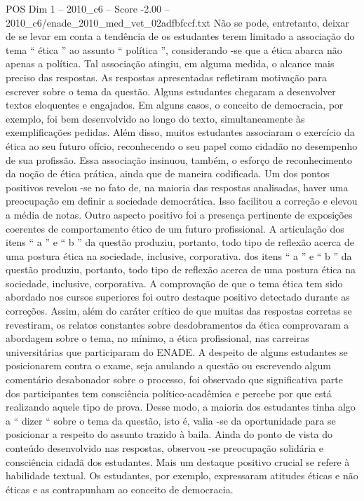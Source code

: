 \begin{textsample}{POS Dim 1 – 2010\_c6 – Score -2.00 – 2010\_c6/enade\_2010\_med\_vet\_02adfbfccf.txt}
Não se pode, entretanto, deixar de se levar em conta a tendência de os estudantes terem limitado a associação do tema “ ética ” ao assunto “ política ”, considerando -se que a ética abarca não apenas a política.
Tal associação atingiu, em alguma medida, o alcance mais preciso das respostas.
As respostas apresentadas refletiram motivação para escrever sobre o tema da questão.
Alguns estudantes chegaram a desenvolver textos eloquentes e engajados.
Em alguns casos, o conceito de democracia, por exemplo, foi bem desenvolvido ao longo do texto, simultaneamente às exemplificações pedidas.
Além disso, muitos estudantes associaram o exercício da ética ao seu futuro ofício, reconhecendo o seu papel como cidadão no desempenho de sua profissão.
Essa associação insinuou, também, o esforço de reconhecimento da noção de ética prática, ainda que de maneira codificada.
Um dos pontos positivos revelou -se no fato de, na maioria das respostas analisadas, haver uma preocupação em definir a sociedade democrática.
Isso facilitou a correção e elevou a média de notas.
Outro aspecto positivo foi a presença pertinente de exposições coerentes de comportamento ético de um futuro profissional.
A articulação dos itens “ a ” e “ b ” da questão produziu, portanto, todo tipo de reflexão acerca de uma postura ética na sociedade, inclusive, corporativa. dos itens “ a ” e “ b ” da questão produziu, portanto, todo tipo de reflexão acerca de uma postura ética na sociedade, inclusive, corporativa.
A comprovação de que o tema ética tem sido abordado nos cursos superiores foi outro destaque positivo detectado durante as correções.
Assim, além do caráter crítico de que muitas das respostas corretas se revestiram, os relatos constantes sobre desdobramentos da ética comprovaram a abordagem sobre o tema, no mínimo, a ética profissional, nas carreiras universitárias que participaram do ENADE.
A despeito de alguns estudantes se posicionarem contra o exame, seja anulando a questão ou escrevendo algum comentário desabonador sobre o processo, foi observado que significativa parte dos participantes tem consciência político-acadêmica e percebe por que está realizando aquele tipo de prova.
Desse modo, a maioria dos estudantes tinha algo a “ dizer “ sobre o tema da questão, isto é, valia -se da oportunidade para se posicionar a respeito do assunto trazido à baila.
Ainda do ponto de vista do conteúdo desenvolvido nas respostas, observou -se preocupação solidária e consciência cidadã dos estudantes.
Mais um destaque positivo crucial se refere à habilidade textual.
Os estudantes, por exemplo, expressaram atitudes éticas e não éticas e as contrapunham ao conceito de democracia.

\end{textsample}
